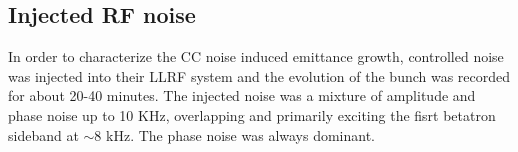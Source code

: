 
 \subsection{Injected RF noise} 

 In order to characterize the CC noise induced emittance growth, controlled noise was injected into their LLRF system and the evolution of the bunch was recorded for about 20-40 minutes. The injected noise was a mixture of amplitude and phase noise up to 10 KHz, overlapping and primarily exciting the fisrt betatron sideband at $\sim 8$ kHz. The phase noise was always dominant. 